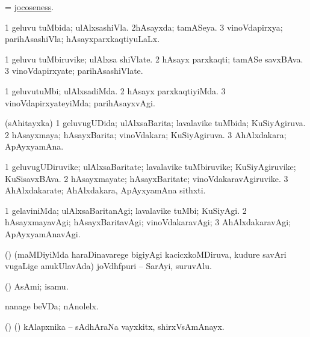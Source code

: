 \bentry
{}
\gl{\nA}
\bmng
= \hyperlink{jocoseness}{jocoseness}. 
\emng
\eentry

\bentry
{}
\gl{\gu}
\bmng
\bnum
\num{1} geluvu tuMbida; ulAlxsashiVla. 
\num{2}hAsayxda; tamASeya. 
\num{3} vinoVdapirxya; parihAsashiVla; hAsayxparxkaqtiyuLaLx. 
\enum
\emng
\eentry

\bentry
{}
\gl{\nA}
\bmng
\bnum
\num{1} geluvu tuMbiruvike; ulAlxsa shiVlate. 
\num{2} hAsayx parxkaqti; tamASe savxBAva. 
\num{3} vinoVdapirxyate; parihAsashiVlate. 
\enum
\emng
\eentry

\bentry
{}
\gl{\kirxvi}
\bmng
\bnum
\num{1} geluvutuMbi; ulAlxsadiMda. 
\num{2} hAsayx parxkaqtiyiMda. 
\num{3} vinoVdapirxyateyiMda; parihAsayxvAgi. 
\enum
\emng
\eentry

\bentry
{}
\gl{\gu}
\bmng
(sAhitayxka) 
\bnum
\num{1} geluvugUDida; ulAlxsaBarita; lavalavike tuMbida; KuSiyAgiruva. 
\num{2} hAsayxmaya; hAsayxBarita; vinoVdakara; KuSiyAgiruva. 
\num{3} AhAlxdakara; ApAyxyamAna. 
\enum
\emng
\eentry

\bentry
{}
\gl{\nA}
\bmng
\bnum
\num{1} geluvugUDiruvike; ulAlxsaBaritate; lavalavike tuMbiruvike; KuSiyAgiruvike; KuSisavxBAva. 
\num{2} hAsayxmayate; hAsayxBaritate; vinoVdakaravAgiruvike. 
\num{3} AhAlxdakarate; AhAlxdakara, ApAyxyamAna sithxti. 
\enum
\emng
\eentry

\bentry
{}
\gl{\kirxvi}
\bmng
\bnum
\num{1} gelaviniMda; ulAlxsaBaritanAgi; lavalavike tuMbi; KuSiyAgi. 
\num{2} hAsayxmayavAgi; hAsayxBaritavAgi; vinoVdakaravAgi; 
\num{3} AhAlxdakaravAgi; ApAyxyamAnavAgi. 
\enum
\emng
\eentry

\bentry
{}
\gl{\nA}
\bmng
(\bava) (maMDiyiMda haraDinavarege bigiyAgi kacicxkoMDiruva, kudure savAri \mo vugaLige anukUlavAda) joVdhfpuri -- SarAyi, suruvAlu. 
\emng
\eentry

\bentry
{}
\gl{\nA}
\bmng
(\ashi) AsAmi; isamu. 
\emng

\noindent
\gl{\nuga}
\bmng
{} nanage beVDa; nAnolelx. 
\emng
\eentry

\bentry
{}
\gl{\nA}
\bmng
(\birx) (\AmA) kAlapxnika -- sAdhAraNa vayxkitx, shirxVsAmAnayx. 
\emng
\eentry

